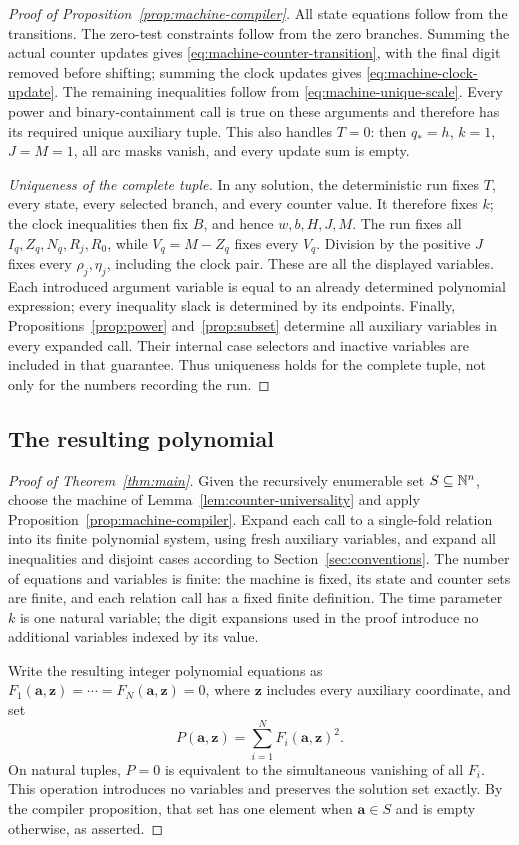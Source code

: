 \begin{proof}[Proof of Proposition~\ref{prop:machine-compiler}]
All state equations follow from the transitions. The zero-test
constraints follow from the zero branches. Summing the actual
counter updates gives \eqref{eq:machine-counter-transition},
with the final digit removed before shifting; summing the clock
updates gives \eqref{eq:machine-clock-update}. The remaining
inequalities follow from \eqref{eq:machine-unique-scale}.
Every power and binary-containment call is true on these arguments
and therefore has its required unique auxiliary tuple.
This also handles $T=0$: then $q_*=h$, $k=1$, $J=M=1$,
all arc masks vanish, and every update sum is empty.

\emph{Uniqueness of the complete tuple.}
In any solution, the deterministic run fixes $T$, every state,
every selected branch, and every counter value. It therefore fixes
$k$; the clock inequalities then fix $B$, and hence $w,b,H,J,M$.
The run fixes all $I_q,Z_q,N_q,R_j,R_0$, while
$V_q=M-Z_q$ fixes every $V_q$. Division by the positive $J$
fixes every $\rho_j,\eta_j$, including the clock pair.
These are all the displayed variables. Each introduced argument
variable is equal to an already determined polynomial expression;
every inequality slack is determined by its endpoints. Finally,
Propositions~\ref{prop:power} and~\ref{prop:subset} determine
all auxiliary variables in every expanded call. Their internal
case selectors and inactive variables are included in that
guarantee. Thus uniqueness holds for the complete tuple, not only
for the numbers recording the run.
\end{proof}

\subsection{The resulting polynomial}

\begin{proof}[Proof of Theorem~\ref{thm:main}]
Given the recursively enumerable set $S\subseteq\mathbb N^n$, choose the
machine of Lemma~\ref{lem:counter-universality} and apply
Proposition~\ref{prop:machine-compiler}. Expand each call to a
single-fold relation into its finite polynomial system, using fresh
auxiliary variables, and expand all inequalities and disjoint cases
according to Section~\ref{sec:conventions}.
The number of equations and variables is finite: the machine is
fixed, its state and counter sets are finite, and each relation call
has a fixed finite definition. The time parameter $k$ is one natural
variable; the digit expansions used in the proof introduce no
additional variables indexed by its value.

Write the resulting integer polynomial equations as
$F_1(\mathbf a,\mathbf z)=\cdots=F_N(\mathbf a,\mathbf z)=0$,
where $\mathbf z$ includes every auxiliary coordinate, and set
\[
 P(\mathbf a,\mathbf z)=\sum_{i=1}^N F_i(\mathbf a,\mathbf z)^2.
\]
On natural tuples, $P=0$ is equivalent to the simultaneous
vanishing of all $F_i$. This operation introduces no variables and
preserves the solution set exactly. By the compiler proposition,
that set has one element when $\mathbf a\in S$ and is empty
otherwise, as asserted.
\end{proof}
